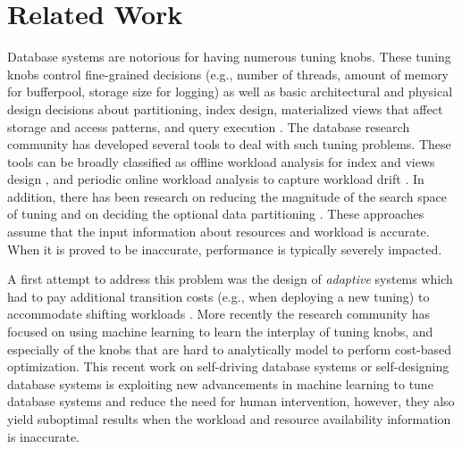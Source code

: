 
\section{Related Work}
\label{sec:related_work}

Database systems are notorious for having numerous tuning knobs. These tuning knobs
control fine-grained decisions (e.g., number of threads, amount of memory for bufferpool,
storage size for logging) as well as basic architectural and physical design decisions 
about partitioning, index design, materialized views that affect storage
and access patterns, and query execution \cite{Bruno2005,Chaudhuri1998a}. 
The database research community has
developed several tools to deal with such tuning problems. These 
tools can be broadly classified as offline workload analysis for index and views design \cite{Agrawal2004,Agrawal2000,Chaudhuri1997,Dageville2004,Valentin2000,Zilio2004},
and periodic online workload 
analysis \cite{Bruno2006,Schnaitter2006,Schnaitter2007,Schnaitter2012} to capture
workload drift \cite{Holze2010}. In addition, there has been research on reducing
the magnitude of the search space of tuning \cite{Bruno2005,Dash2011} and on deciding the optional data partitioning 
\cite{Athanassoulis2019,Papadomanolakis2004,Serafini2016,Sun2014,Sun2016}.
%
These approaches assume that the input information
about resources and workload is accurate. When it is proved to be inaccurate, performance is typically severely impacted.



A first attempt to address this problem
was the design of \textit{adaptive} systems which had to pay additional transition costs
(e.g., when deploying a new tuning) to accommodate shifting workloads \cite{Idreos2007,Graefe2010a,Graefe2010c,Schuhknecht2018}. 
More recently the research community has focused on using machine learning to 
learn the interplay of tuning knobs, and especially of the knobs that are hard 
to analytically model to perform cost-based optimization. This recent work on
self-driving database systems \cite{Aken2017,Ma2018,Pavlo2017} or
self-designing database systems \cite{Idreos2019,Idreos2019a,Idreos2018a,Idreos2018} 
is exploiting new advancements in machine learning to tune database systems and reduce
the need for human intervention, however, they also yield suboptimal results
when the workload and resource availability information is inaccurate. 

